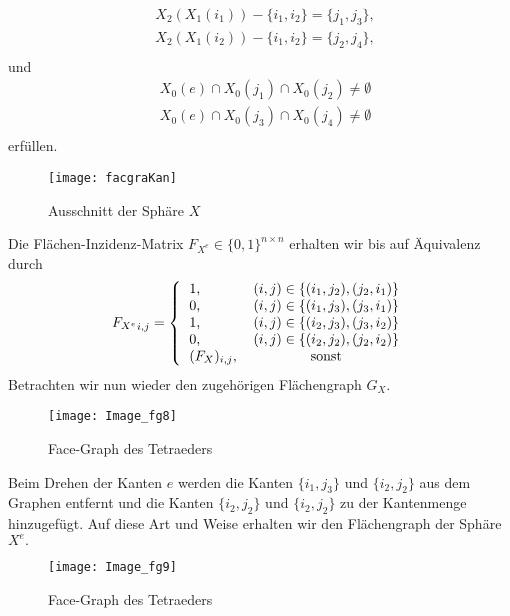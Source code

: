 \documentclass[12pt,titlepage,twoside,cleardoublepage]{article}
\theoremstyle{nummermitklammern}
\numberwithin{equation}{section}
\begin{document}
\begin{enumerate}
\begin{itemize}
\begin{align*}
&X_2(X_1(i_1))-\{i_1,i_2\}=\{j_1,j_3\},\\
&X_2(X_1(i_2))-\{i_1,i_2\}=\{j_2,j_4\},\\
\end{align*}
und 
\begin{align*}
&X_0(e)\cap X_0(j_1) \cap X_0(j_2)\neq \emptyset\\
 &X_0(e)\cap X_0(j_3) \cap X_0(j_4)\neq \emptyset\\
\end{align*}
erfüllen.
\begin{figure}[H]
\begin{center}
\texttt{[image: facgraKan]}
\end{center}
\caption{Ausschnitt der Sphäre $X$}
\end{figure}
 Die Flächen-Inzidenz-Matrix $F_{X^e}\in \{0,1\}^{n\times n}$ erhalten wir bis auf Äquivalenz durch
\[
{F_{X^e}}_{i,j}=
\Biggl{\{\begin{tabular}[l]{lcr}
1,&\textcolor{black}{$(i,j)\in \{(i_1,j_2),(j_2,i_1)\}$} \\
0,&\textcolor{black}{$(i,j)\in \{(i_1,j_3),(j_3,i_1)\}$} \\
1,&\textcolor{black}{$(i,j)\in \{(i_2,j_3),(j_3,i_2)\}$} \\
0,&\textcolor{black}{$(i,j)\in \{(i_2,j_2),(j_2,i_2)\}$} \\
$(F_{X})_{i,j}$,& sonst\\
\end{tabular}}
\]
Betrachten wir nun wieder den zugehörigen Flächengraph $G_X.$ 
\begin{figure}[H]
\begin{center}
\texttt{[image: Image\_fg8]}
\end{center}
\caption{Face-Graph des Tetraeders}
\end{figure}
Beim Drehen der Kanten $e$ werden die Kanten $\{i_1,j_3\}$ und $\{i_2,j_2\}$ aus dem Graphen entfernt und die Kanten $\{i_2,j_2\}$ und $\{i_2,j_2\}$ zu der Kantenmenge hinzugefügt. Auf diese Art und Weise erhalten wir den Flächengraph der Sphäre $X^e.$ 
\begin{figure}[H]
\begin{center}
\texttt{[image: Image\_fg9]}
\end{center}
\caption{Face-Graph des Tetraeders}
\end{figure}
\end{itemize}

\end{enumerate}
\end{document}
